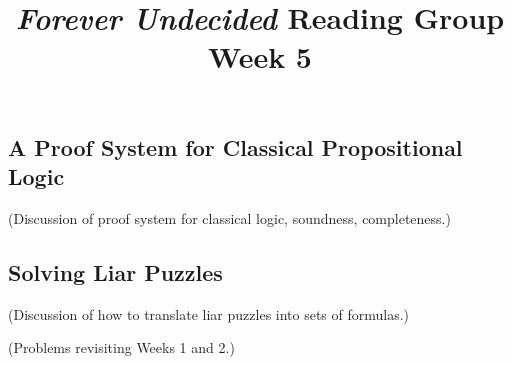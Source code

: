 \documentclass{article}
\title{\emph{Forever Undecided} Reading Group \\ Week 5}
\date{}
\author{}
\begin{document}
\maketitle

\subsection*{A Proof System for Classical Propositional Logic}

(Discussion of proof system for classical logic, soundness, completeness.)

\subsection*{Solving Liar Puzzles}

(Discussion of how to translate liar puzzles into sets of formulas.)

(Problems revisiting Weeks 1 and 2.)
\end{document}
